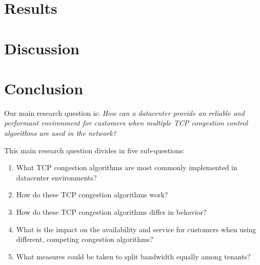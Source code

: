 \documentclass{article}
\begin{document}
\section{Results}


\section{Discussion}


\section{Conclusion}


Our main research question is:
{\it How can a datacenter provide an reliable and performant environment for
customers when multiple TCP congestion control algorithms are used in the
network?}

\vspace{0.5cm}

This main research question divides in five sub-questions:

\begin{enumerate}
	\item What TCP congestion algorithms are most commonly implemented in datacenter environments?
	\item How do these TCP congestion algorithms work?
	\item How do these TCP congestion algorithms differ in behavior?
	\item What is the impact on the availability and service for customers when using different, competing congestion algorithms?
	\item What measures could be taken to split bandwidth equally among tenants?
\end{enumerate}


\end{document}
